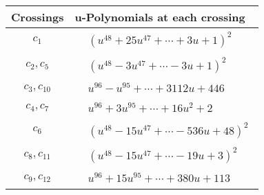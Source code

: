 \documentclass[1p]{elsarticle_modified}
\theoremstyle{definition}
\begin{document}
\begin{tabular}{m{50pt}|m{274pt}}
Crossings & \hspace{64pt}u-Polynomials at each crossing \\
\hline $$\begin{aligned}c_{1}\end{aligned}$$&$\begin{aligned}
&(u^{48}+25 u^{47}+\cdots+3 u+1)^{2}
\end{aligned}$\\
\hline $$\begin{aligned}c_{2},c_{5}\end{aligned}$$&$\begin{aligned}
&(u^{48}-3 u^{47}+\cdots-3 u+1)^{2}
\end{aligned}$\\
\hline $$\begin{aligned}c_{3},c_{10}\end{aligned}$$&$\begin{aligned}
&u^{96}- u^{95}+\cdots+3112 u+446
\end{aligned}$\\
\hline $$\begin{aligned}c_{4},c_{7}\end{aligned}$$&$\begin{aligned}
&u^{96}+3 u^{95}+\cdots+16 u^2+2
\end{aligned}$\\
\hline $$\begin{aligned}c_{6}\end{aligned}$$&$\begin{aligned}
&(u^{48}-15 u^{47}+\cdots-536 u+48)^{2}
\end{aligned}$\\
\hline $$\begin{aligned}c_{8},c_{11}\end{aligned}$$&$\begin{aligned}
&(u^{48}-15 u^{47}+\cdots-19 u+3)^{2}
\end{aligned}$\\
\hline $$\begin{aligned}c_{9},c_{12}\end{aligned}$$&$\begin{aligned}
&u^{96}+15 u^{95}+\cdots+380 u+113
\end{aligned}$\\
\hline
\end{tabular}\\~\\
\newpage\renewcommand{\arraystretch}{1}
\end{document}
